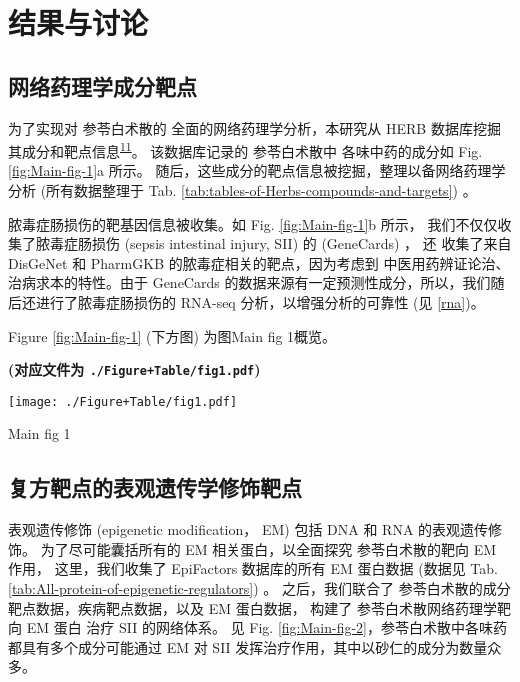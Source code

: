 \documentclass[
]{article}
\begin{document}
\hypertarget{results}{%
\section{结果与讨论}\label{results}}

\hypertarget{pharm}{%
\subsection{网络药理学成分靶点}\label{pharm}}

为了实现对 参苓白术散的 全面的网络药理学分析，本研究从 HERB 数据库挖掘 其成分和靶点信息\textsuperscript{\protect\hyperlink{ref-HerbAHighThFang2021}{11}}。
该数据库记录的 参苓白术散中 各味中药的成分如 Fig. \ref{fig:Main-fig-1}a 所示。
随后，这些成分的靶点信息被挖掘，整理以备网络药理学分析 (所有数据整理于 Tab. \ref{tab:tables-of-Herbs-compounds-and-targets}) 。

脓毒症肠损伤的靶基因信息被收集。如 Fig. \ref{fig:Main-fig-1}b 所示，
我们不仅仅收集了脓毒症肠损伤 (sepsis intestinal injury, SII) 的 (GeneCards) ，
还 收集了来自 DisGeNet 和 PharmGKB 的脓毒症相关的靶点，因为考虑到
中医用药辨证论治、治病求本的特性。由于 GeneCards 的数据来源有一定预测性成分，所以，我们随后还进行了脓毒症肠损伤的
RNA-seq 分析，以增强分析的可靠性 (见 \ref{rna})。

Figure \ref{fig:Main-fig-1} (下方图) 为图Main fig 1概览。

\textbf{(对应文件为 \texttt{./Figure+Table/fig1.pdf})}

\def\@captype{figure}
\begin{center}
\texttt{[image: ./Figure+Table/fig1.pdf]}
\caption{Main fig 1}\label{fig:Main-fig-1}
\end{center}

\hypertarget{ux590dux65b9ux9776ux70b9ux7684ux8868ux89c2ux9057ux4f20ux5b66ux4feeux9970ux9776ux70b9}{%
\subsection{复方靶点的表观遗传学修饰靶点}\label{ux590dux65b9ux9776ux70b9ux7684ux8868ux89c2ux9057ux4f20ux5b66ux4feeux9970ux9776ux70b9}}

表观遗传修饰 (epigenetic modification， EM) 包括 DNA 和 RNA 的表观遗传修饰。
为了尽可能囊括所有的 EM 相关蛋白，以全面探究 参苓白术散的靶向 EM 作用，
这里，我们收集了 EpiFactors 数据库的所有 EM 蛋白数据
(数据见 Tab. \ref{tab:All-protein-of-epigenetic-regulators}) 。
之后，我们联合了 参苓白术散的成分靶点数据，疾病靶点数据，以及 EM 蛋白数据，
构建了 参苓白术散网络药理学靶向 EM 蛋白 治疗 SII 的网络体系。
见 Fig. \ref{fig:Main-fig-2}，参苓白术散中各味药都具有多个成分可能通过
EM 对 SII 发挥治疗作用，其中以砂仁的成分为数量众多。
\end{document}
